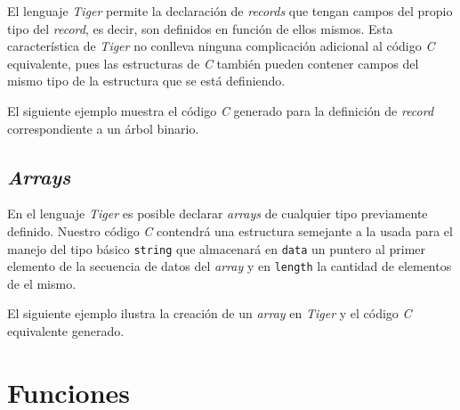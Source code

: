 \documentclass{article}
\begin{document}
\begin{quote}

\end{quote}

\begin{quote}

\end{quote}

El lenguaje \textit{Tiger} permite la declaración de \textit{records}
que tengan campos del propio tipo del \emph{record}, es decir, son definidos en
función de ellos mismos. Esta característica de \textit{Tiger} no conlleva
ninguna complicación adicional al código \textit{C} equivalente, pues las
estructuras de \textit{C} también pueden contener campos del mismo tipo de la
estructura que se está definiendo.

El siguiente ejemplo muestra el código \textit{C} generado para la definición
de \textit{record} correspondiente a un árbol binario.

\begin{quote}

\end{quote}

\begin{quote}

\end{quote}

\subsection{\emph{Arrays}}

En el lenguaje \textit{Tiger} es posible declarar \textit{arrays} de cualquier
tipo previamente definido. Nuestro código \textit{C} contendrá una estructura
semejante a la usada para el manejo del tipo básico \texttt{string} que
almacenará en \texttt{data} un puntero al primer elemento de la secuencia de
datos del \emph{array} y en \texttt{length} la cantidad de elementos de el
mismo.

El siguiente ejemplo ilustra la creación de un \textit{array} en \textit{Tiger}
y el código \textit{C} equivalente generado.

\begin{quote}

\end{quote}

\begin{quote}

\end{quote}

\section{Funciones}
\end{document}
